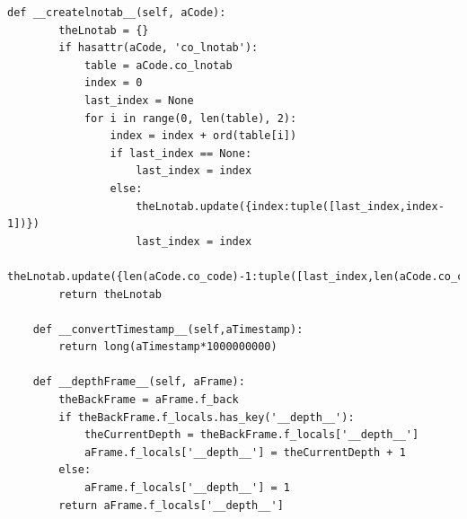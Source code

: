 \documentclass[12pt,legalpaper]{report}
\begin{document}
\begin{singlespace}
\begin{lstlisting}[style=Python]
    def __createlnotab__(self, aCode):
        theLnotab = {}
        if hasattr(aCode, 'co_lnotab'):
            table = aCode.co_lnotab
            index = 0
            last_index = None
            for i in range(0, len(table), 2):
                index = index + ord(table[i])
                if last_index == None:
                    last_index = index
                else:
                    theLnotab.update({index:tuple([last_index,index-1])})                
                    last_index = index
            theLnotab.update({len(aCode.co_code)-1:tuple([last_index,len(aCode.co_code)-1])})                
        return theLnotab        

    def __convertTimestamp__(self,aTimestamp):
        return long(aTimestamp*1000000000)

    def __depthFrame__(self, aFrame):
        theBackFrame = aFrame.f_back
        if theBackFrame.f_locals.has_key('__depth__'):
            theCurrentDepth = theBackFrame.f_locals['__depth__']
            aFrame.f_locals['__depth__'] = theCurrentDepth + 1
        else:
            aFrame.f_locals['__depth__'] = 1
        return aFrame.f_locals['__depth__']
    

\end{lstlisting}
\end{singlespace}
\end{document}
